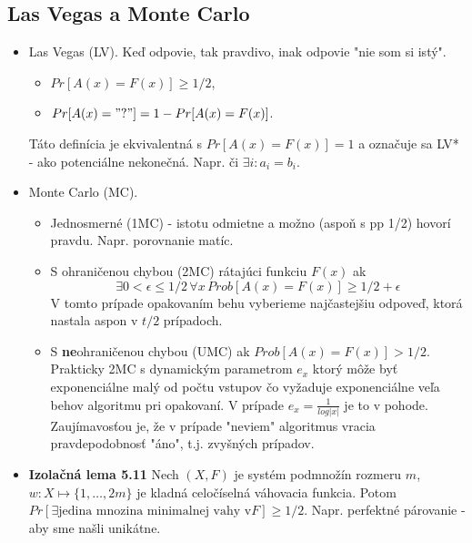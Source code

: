 \documentclass[12pt,a4paper]{article}
\begin{document}
  \subsection{Las Vegas a Monte Carlo} 
  \begin{itemize} 
    \item Las Vegas (LV). Keď odpovie, tak pravdivo, inak odpovie "nie som si istý". 
      \begin{itemize}
        \item $Pr[A(x) = F(x)] \geq 1/2$, 
        \item $Pr[A(x) = "?"] = 1 - Pr[A(x) = F(x)]$. 
      \end{itemize} 
      Táto definícia je ekvivalentná s $Pr[A(x) = F(x)] = 1$ a označuje sa LV* - ako potenciálne nekonečná.
      Napr. či $\exists i : a_i = b_i$. 
    \item Monte Carlo (MC). 
    \begin{itemize} 
      \item Jednosmerné (1MC) - istotu odmietne a možno (aspoň s pp 1/2) hovorí pravdu. Napr. porovnanie matíc. 
      \item S ohraničenou chybou (2MC) rátajúci funkciu $F(x)$ ak $$
        \exists 0 < \epsilon \leq 1/2 \, \forall x \, Prob[A(x) = F(x)] \geq 1/2 + \epsilon
      $$
      V tomto prípade opakovaním behu vyberieme najčastejšiu odpoveď, ktorá nastala aspon v $t/2$ prípadoch. 
      \item S {\bf ne}ohraničenou chybou (UMC) ak $Prob[A(x) = F(x)] > 1/2$. Prakticky 2MC s dynamickým parametrom $e_x$ ktorý môže byť exponenciálne malý od počtu vstupov čo vyžaduje exponenciálne veľa behov algoritmu pri opakovaní. V prípade $e_x = \frac{1}{log|x|}$ je to v pohode. Zaujímavosťou je, že v prípade "neviem" algoritmus vracia pravdepodobnosť "áno", t.j. zvyšných prípadov. 
    \end{itemize} 
    
    \item {\bf Izolačná lema 5.11} Nech $(X,F)$ je systém podmnožín rozmeru $m$, $w : X \mapsto \{1,\ldots,2m\}$ je kladná celočíselná váhovacia funkcia. Potom $Pr[\exists \mbox{jedina mnozina minimalnej vahy v} F] \geq 1/2$. Napr. perfektné párovanie - aby sme našli unikátne. 
  \end{itemize} 
  
\end{document}
